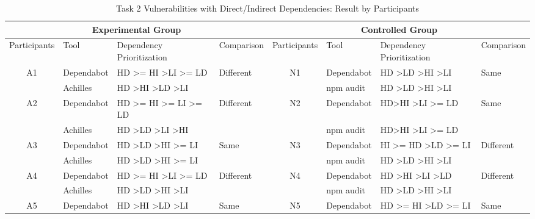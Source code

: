 \documentclass[conference]{IEEEtran}
\begin{document}
	
	
	\begin{table}[tb]
		\caption{Task 2 Vulnerabilities with Direct/Indirect Dependencies: Result by Participants}
		\centering
		\begin{tabular}{clll|clll}
			\toprule
			\multicolumn{4}{c|}{Experimental Group} & \multicolumn{4}{c}{Controlled Group}  \\ 
			\midrule
			Participants         & Tool       & Dependency Prioritization & Comparison & Participants & Tool  & Dependency Prioritization & Comparison \\ 
			\midrule
			\multirow{2}{*}{A1}  & Dependabot & HD \textgreater{}= HI \textgreater LI \textgreater{}= LD    & \multirow{2}{*}{Different}      & \multirow{2}{*}{N1} & Dependabot & HD \textgreater LD \textgreater HI \textgreater LI  & \multirow{2}{*}{Same} \\ 
			& Achilles   & HD \textgreater HI \textgreater LD \textgreater LI & & & npm audit & HD \textgreater LD \textgreater HI \textgreater LI & \\ 
			\midrule
			\multirow{2}{*}{A2}  & Dependabot & HD \textgreater{}= HI \textgreater{}= LI \textgreater{}= LD & \multirow{2}{*}{Different}      & \multirow{2}{*}{N2} & Dependabot & HD\textgreater HI \textgreater LI \textgreater = LD &  \multirow{2}{*}{Same} \\
			& Achilles   & HD \textgreater LD \textgreater LI \textgreater HI & & & npm audit & HD\textgreater HI \textgreater LI \textgreater = LD &  \\ 
			\midrule
			\multirow{2}{*}{A3}  & Dependabot & HD \textgreater LD \textgreater HI \textgreater{}= LI & \multirow{2}{*}{Same} & \multirow{2}{*}{N3} & Dependabot & HI \textgreater{}= HD \textgreater LD \textgreater{}= LI &  \multirow{2}{*}{Different} \\ 
			& Achilles   & HD \textgreater LD \textgreater HI \textgreater{}= LI & & & npm audit & HD \textgreater LD \textgreater HI \textgreater LI  & \\ 
			\midrule
			\multirow{2}{*}{A4}  & Dependabot & HD \textgreater{}= HI \textgreater LI \textgreater{}= LD    & \multirow{2}{*}{Different}      & \multirow{2}{*}{N4} & Dependabot & HD \textgreater HI \textgreater LI \textgreater LD & \multirow{2}{*}{Different} \\ 
			& Achilles   & HD \textgreater LD \textgreater HI \textgreater LI & & & npm audit &  HD \textgreater LD \textgreater HI \textgreater LI & \\ 
			\midrule
			\multirow{2}{*}{A5}  & Dependabot & HD \textgreater HI \textgreater LD \textgreater LI          & \multirow{2}{*}{Same}           & \multirow{2}{*}{N5} & Dependabot & HD \textgreater{}= HI \textgreater LD \textgreater{}= LI & \multirow{2}{*}{Same} \\ 

\end{tabular}
\end{table}
\end{document}
